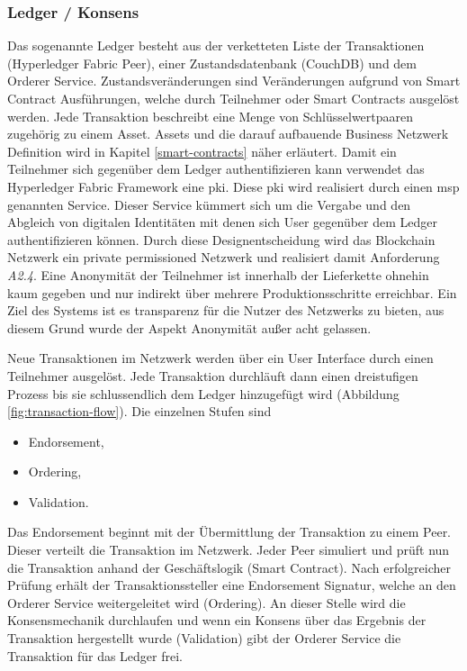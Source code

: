 \subsubsection{Ledger / Konsens}
Das sogenannte Ledger besteht aus der verketteten Liste der Transaktionen (Hyperledger Fabric Peer), einer Zustandsdatenbank (CouchDB) und dem Orderer Service. Zustandsveränderungen sind Veränderungen aufgrund von Smart Contract Ausführungen, welche durch Teilnehmer oder Smart Contracts ausgelöst werden. Jede Transaktion beschreibt eine Menge von Schlüsselwertpaaren zugehörig zu einem Asset. Assets und die darauf aufbauende Business Netzwerk Definition wird in Kapitel \ref{smart-contracts} näher erläutert. Damit ein Teilnehmer sich gegenüber dem Ledger authentifizieren kann verwendet das Hyperledger Fabric Framework eine \acf{pki}. Diese \ac{pki} wird realisiert durch einen \ac{msp} genannten Service. Dieser Service kümmert sich um die Vergabe und den Abgleich von digitalen Identitäten mit denen sich User gegenüber dem Ledger authentifizieren können. Durch diese Designentscheidung wird das Blockchain Netzwerk ein private permissioned Netzwerk und realisiert damit Anforderung \textit{A2.4}. Eine Anonymität der Teilnehmer ist innerhalb der Lieferkette ohnehin kaum gegeben und nur indirekt über mehrere Produktionsschritte erreichbar. Ein Ziel des Systems ist es transparenz für die Nutzer des Netzwerks zu bieten, aus diesem Grund wurde der Aspekt Anonymität außer acht gelassen. 

Neue Transaktionen im Netzwerk werden über ein User Interface durch einen Teilnehmer ausgelöst. Jede Transaktion durchläuft dann einen dreistufigen Prozess bis sie schlussendlich dem Ledger hinzugefügt wird (Abbildung \ref{fig:transaction-flow}). Die einzelnen Stufen sind 

\begin{itemize}
	\item Endorsement,
	\item Ordering,
	\item Validation.
\end{itemize}

\noindent
Das Endorsement beginnt mit der Übermittlung der Transaktion zu einem Peer. Dieser verteilt die Transaktion im Netzwerk. Jeder Peer simuliert und prüft nun die Transaktion anhand der Geschäftslogik (Smart Contract). Nach erfolgreicher Prüfung erhält der Transaktionssteller eine Endorsement Signatur, welche an den Orderer Service weitergeleitet wird (Ordering). An dieser Stelle wird die Konsensmechanik durchlaufen und wenn ein Konsens über das Ergebnis der Transaktion hergestellt wurde (Validation) gibt der Orderer Service die Transaktion für das Ledger frei.


